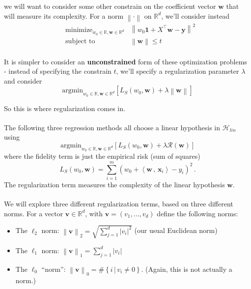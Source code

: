 \documentclass[11pt]{article}
\newcommand{\norm}[1]{\left\| #1\right\|}
\newcommand{\R}{\ensuremath{\mathbb{R}}}
\newcommand{\Tr}{\ensuremath{\top}}
\newcommand{\Rc}{\mathcal{R}}
\newcommand{\Hc}{\mathcal{H}}
\newcommand{\innerr}[2]{{\left\langle #1\,,\,#2 \right\rangle}}
\newcommand{\V}[1]{\mathbf{#1}}
\begin{document}
    we will want to consider some other constrain on the coefficient vector
    $\V{w}$ that will measure its complexity. For a norm $\norm{\cdot}$ on
    $\R^d$, we'll consider instead 
    \begin{eqnarray*}
  & \text{minimize}_{w_0\in\R,\V{w}\in\R^{d}}   &  \norm{  w_0\mathbf{1} + X^\Tr\V{w} -\V{y}  }^2 \\
      & \text{subject to} &  \norm{\V{w}} \leq t
    \end{eqnarray*}
~\\
    It is simpler to consider an {\bf unconstrained}  form of these optimization
    problems - instead of specifying the constrain $t$, we'll specify a
    regularization parameter $\lambda$ and consider
\[
     \text{argmin}_{w_0\in\R,\V{w}\in\R^{d}} \left[L_S(w_0,\V{w})+  \lambda
     \norm{\V{w}} \right]
\]


    So this is where regularization comes in.
\\~\\
        The following three regression methods all choose a linear hypothesis in
    $\Hc_{lin}$ using
\[
  \text{argmin}_{w_0\in\R,\V{w}\in\R^{d}} \left[L_S(w_0,\V{w})+  \lambda
  \Rc(\V{w}) \right]
\]
where the fidelity term is just the empirical risk (sum of squares)
\[
  L_S(w_0,\V{w}) = \sum_{i=1}^m \left( w_0 + \innerr{\V{w}}{\V{x}_i} -y_i \right)^2\,.
\]
The regularization term measures the complexity of the linear hypothesis $\V{w}$. 
\\~\\
We will explore three different regularization terms, based on three different
norms. For a vector $\V{v}\in\R^d$, with $\V{v}=(v_1,\ldots,v_d)$ 
define the following norms:

\begin{itemize}
  \item The $\ell_2$ norm: $\norm{\V{v}}_2 = \sqrt{\sum_{j=1}^d |v_i|^2}$ (our
    usual Euclidean norm)
  \item The $\ell_1$ norm: $\norm{\V{v}}_1 = \sum_{j=1}^d |v_i|$
  \item The $\ell_0$ ``norm'':  $\norm{\V{v}}_0 = \#\left\{ i\,|\, v_i\neq 0
    \right\}$. (Again, this is not actually a norm.)
\end{itemize}
\end{document}
